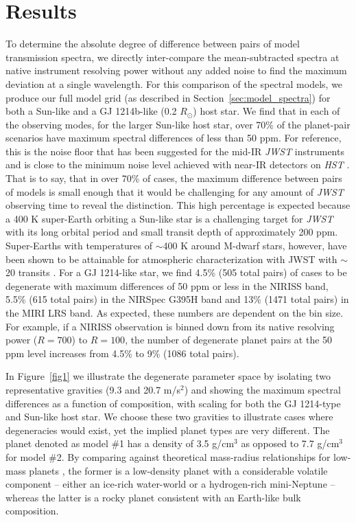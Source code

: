 \documentclass[iop]{emulateapj}
\begin{document}
\section{Results}

To determine the absolute degree of difference between pairs of model transmission spectra, we directly inter-compare the mean-subtracted spectra at native instrument resolving power without any added noise to find the maximum deviation at a single wavelength. For this comparison of the spectral models, we produce our full model grid (as described in Section~\ref{sec:model_spectra}) for both a Sun-like and a GJ 1214b-like (0.2 $R_{\odot}$) host star.  We find that in each of the observing modes, for the larger Sun-like host star, over 70\% of the planet-pair scenarios have maximum spectral differences of less than 50 ppm. For reference, this is the noise floor that has been suggested for the mid-IR \emph{JWST} instruments \citep{gre16} and is close to the minimum noise level achieved with near-IR detectors on \emph{HST} \citep{lin16}.  That is to say, that in over 70\% of cases, the maximum difference between pairs of models is small enough that it would be challenging for any amount of \emph{JWST} observing time to reveal the distinction. This high percentage is expected because a 400 K super-Earth orbiting a Sun-like star is a challenging target for \emph{JWST} with its long orbital period and small transit depth of approximately 200 ppm. Super-Earths with temperatures of $\sim$400 K around M-dwarf stars, however, have been shown to be attainable for atmospheric characterization with JWST with $\sim$20 transits \citep{bat15,bar15,gre16}. For a GJ 1214-like star, we find 4.5\% (505 total pairs) of cases to be degenerate with maximum differences of 50 ppm or less in the NIRISS band, 5.5\% (615 total pairs) in the NIRSpec G395H band and 13\% (1471 total pairs) in the MIRI LRS band. As expected, these numbers are dependent on the bin size. For example, if a NIRISS observation is binned down from its native resolving power ($R=700$) to $R=100$, the number of degenerate planet pairs at the 50 ppm level increases from 4.5\% to 9\% (1086 total pairs).

In Figure~\ref{fig1} we illustrate the degenerate parameter space by isolating two representative gravities (9.3 and 20.7 m/s$^2$) and showing the maximum spectral differences as a function of composition, with scaling for both the GJ 1214-type and Sun-like host star.  We choose these two gravities to illustrate cases where degeneracies would exist, yet the implied planet types are very different. The planet denoted as model \#1 has a density of 3.5 g/cm$^3$ as opposed to 7.7 g/cm$^3$ for model \#2. By comparing against theoretical mass-radius relationships for low-mass planets \citep{for07,sea07}, the former is a low-density planet with a considerable volatile component -- either an ice-rich water-world or a hydrogen-rich mini-Neptune -- whereas the latter is a rocky planet consistent with an Earth-like bulk composition.  
\end{document}
